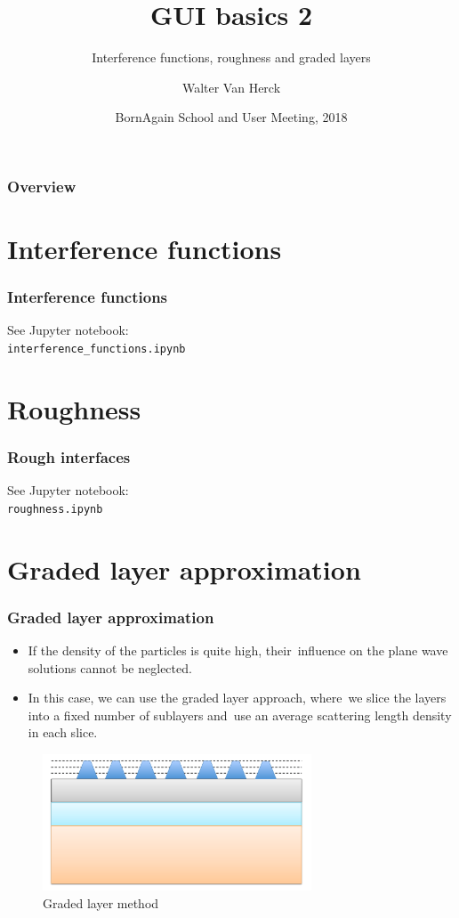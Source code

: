\documentclass{beamer}
\title{GUI basics 2}
\subtitle{Interference functions, roughness and graded layers}
\author
{Walter Van Herck\inst{1}}
\institute[JCNS at MLZ] %
{
  \inst{1}%
  J\"ulich Centre for Neutron Science at MLZ
}
\date[BornAgain] %
{BornAgain School and User Meeting, 2018}
\begin{document}
\frame[plain]{\titlepage}

\begin{frame}
    \frametitle{Overview}
    \tableofcontents
\end{frame}

\section{Interference functions}

\begin{frame}[fragile]
    \frametitle{Interference functions}
    \begin{center}
        See Jupyter notebook:\\
        \verb+interference_functions.ipynb+
    \end{center}
\end{frame}

\section{Roughness}

\begin{frame}[fragile]
    \frametitle{Rough interfaces}
    \begin{center}
        See Jupyter notebook:\\
        \verb+roughness.ipynb+
    \end{center}
\end{frame}

\section{Graded layer approximation}

\begin{frame}
    \frametitle{Graded layer approximation}
    \begin{center}
        \begin{itemize}
            \item If the density of the particles is quite high, their\
                  influence on the plane wave solutions cannot be neglected.
            \item In this case, we can use the graded layer approach, where\
                  we slice the layers into a fixed number of sublayers and\
                  use an average scattering length density in each slice.
        \end{itemize}
        \begin{figure}
            \includegraphics[width=8cm]{graded_layer.png}
            \\ Graded layer method
        \end{figure}
    \end{center}
\end{frame}
\end{document}
